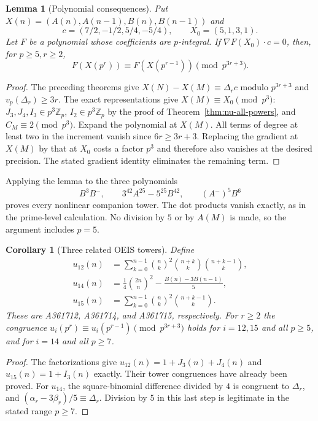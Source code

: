 \documentclass[11pt]{amsart}
\newtheorem{lemma}[theorem]{Lemma}
\newtheorem{corollary}[theorem]{Corollary}
\theoremstyle{definition}
\theoremstyle{remark}
\begin{document}
\begin{lemma}[Polynomial consequences]\label{lem:poly-new}
Put $X(n)=(A(n),A(n-1),B(n),B(n-1))$ and
\[
c=(7/2,-1/2,5/4,-5/4),\qquad X_0=(5,1,3,1).
\]
Let $F$ be a polynomial whose coefficients are $p$-integral.
If $\nabla F(X_0)\mathbin{\cdot}c=0$, then, for $p\ge5,r\ge2$,
\[
F(X(p^r))\equiv F(X(p^{r-1}))\pmod{p^{3r+3}}.
\]
\end{lemma}
\begin{proof}
The preceding theorems give $X(N)-X(M)\equiv\Delta_r c$
modulo $p^{3r+3}$ and $v_p(\Delta_r)\ge3r$.
The exact representations give $X(M)\equiv X_0\pmod{p^3}$:
$J_3,J_4,I_3\in p^3\mathbb Z_p$, $I_2\in p^3\mathbb Z_p$ by
the proof of Theorem~\ref{thm:nu-all-powers}, and
$C_M\equiv2\pmod{p^3}$.
Expand the polynomial at $X(M)$. All terms of degree at least two
in the increment vanish since $6r\ge3r+3$.
Replacing the gradient at $X(M)$ by that at $X_0$ costs a factor
$p^3$ and therefore also vanishes at the desired precision.
The stated gradient identity eliminates the remaining term.
\end{proof}

Applying the lemma to the three polynomials
\[
B^3B^-,\qquad
3^{42}A^{25}-5^{25}B^{42},\qquad
(A^-)^5B^6
\]
proves every nonlinear companion tower. The dot products vanish
exactly, as in the prime-level calculation. No division by $5$ or
by $A(M)$ is made, so the argument includes $p=5$.

\begin{corollary}[Three related OEIS towers]\label{cor:extra-new}
Define
\begin{align*}
u_{12}(n)&=\sum_{k=0}^{n-1}\binom nk^2\binom{n+k}k\binom{n+k-1}k,\\
u_{14}(n)&=\frac14\binom{2n}n^2-\frac{B(n)-3B(n-1)}5,\\
u_{15}(n)&=\sum_{k=0}^{n-1}\binom nk^2\binom{n+k-1}k.
\end{align*}
These are A361712, A361714, and A361715, respectively.
For $r\ge2$ the congruence
$u_i(p^r)\equiv u_i(p^{r-1})\pmod{p^{3r+3}}$
holds for $i=12,15$ and all $p\ge5$, and for $i=14$ and all $p\ge7$.
\end{corollary}
\begin{proof}
The factorizations give $u_{12}(n)=1+J_3(n)+J_4(n)$ and
$u_{15}(n)=1+I_3(n)$ exactly. Their tower congruences have already
been proved. For $u_{14}$, the square-binomial difference divided
by $4$ is congruent to $\Delta_r$, and
$(\alpha_r-3\beta_r)/5\equiv\Delta_r$. Division by $5$ in
this last step is legitimate in the stated range $p\ge7$.
\end{proof}
\end{document}
